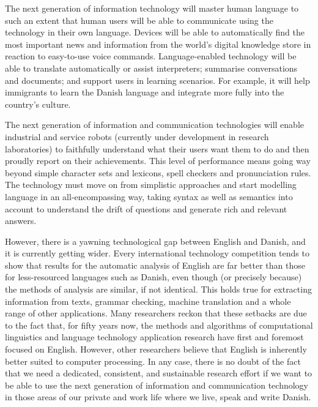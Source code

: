 \begin{multicols}{2}
The next generation of information technology will master human
language to such an extent that human users will be able to
communicate using the technology in their own language. Devices will
be able to automatically find the most important news and information
from the world’s digital knowledge store in reaction to easy-to-use
voice commands. Language-enabled technology will be able to translate
automatically or assist interpreters; summarise conversations and
documents; and support users in learning scenarios. For example, it
will help immigrants to learn the Danish language and integrate more
fully into the country’s culture.

The next generation of information and communication technologies will
enable industrial and service robots (currently under development in
research laboratories) to faithfully understand what their users want
them to do and then proudly report on their achievements.  This level
of performance means going way beyond simple character sets and
lexicons, spell checkers and pronunciation rules. The technology must
move on from simplistic approaches and start modelling language in an
all-encompassing way, taking syntax as well as semantics into account
to understand the drift of questions and generate rich and relevant
answers.

However, there is a yawning technological gap between English and
Danish, and it is currently getting wider. Every international
technology competition tends to show that results for the automatic
analysis of English are far better than those for less-resourced
languages such as Danish, even though (or precisely because) the
methods of analysis are similar, if not identical. This holds true for
extracting information from texts, grammar checking, machine
translation and a whole range of other applications. Many researchers
reckon that these setbacks are due to the fact that, for fifty years
now, the methods and algorithms of computational linguistics and
language technology application research have first and foremost
focused on English. However, other researchers believe that English is
inherently better suited to computer processing. In any case, there is
no doubt of the fact that we need a dedicated, consistent, and
sustainable research effort if we want to be able to use the next
generation of information and communication technology in those areas
of our private and work life where we live, speak and write Danish.


\end{multicols}
